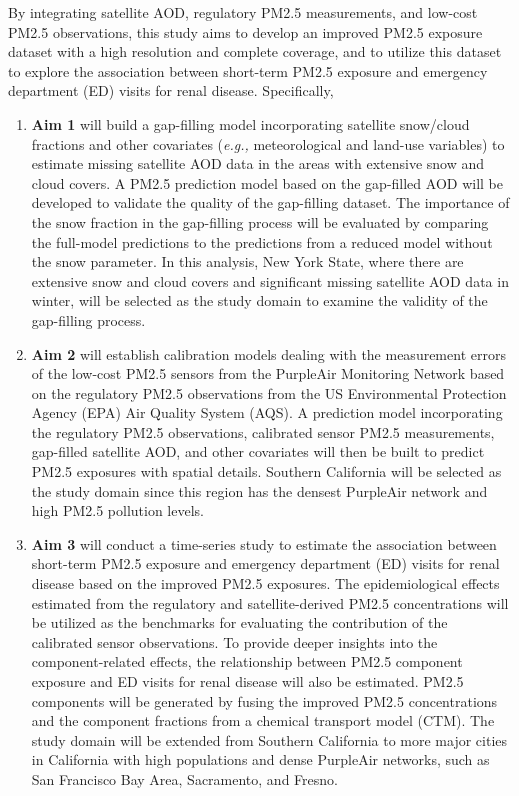 \documentclass[11pt]{article}
\begin{document}
By integrating satellite AOD, regulatory PM2.5 measurements, and low-cost PM2.5 observations, this study aims to develop an improved PM2.5 exposure dataset with a high resolution and complete coverage, and to utilize this dataset to explore the association between short-term PM2.5 exposure and emergency department (ED) visits for renal disease. Specifically,
\begin{enumerate}[1)]
\item \textbf{Aim 1} will build a gap-filling model incorporating satellite snow/cloud fractions and other covariates (\textit{e.g.,} meteorological and land-use variables) to estimate missing satellite AOD data in the areas with extensive snow and cloud covers. A PM2.5 prediction model based on the gap-filled AOD will be developed to validate the quality of the gap-filling dataset. The importance of the snow fraction in the gap-filling process will be evaluated by comparing the full-model predictions to the predictions from a reduced model without the snow parameter. In this analysis, New York State, where there are extensive snow and cloud covers and significant missing satellite AOD data in winter, will be selected as the study domain to examine the validity of the gap-filling process. 
\item \textbf{Aim 2} will establish calibration models dealing with the measurement errors of the low-cost PM2.5 sensors from the PurpleAir Monitoring Network based on the regulatory PM2.5 observations from the US Environmental Protection Agency (EPA) Air Quality System (AQS). A prediction model incorporating the regulatory PM2.5 observations, calibrated sensor PM2.5 measurements, gap-filled satellite AOD, and other covariates will then be built to predict PM2.5 exposures with spatial details. Southern California will be selected as the study domain since this region has the densest PurpleAir network and high PM2.5 pollution levels.
\item \textbf{Aim 3} will conduct a time-series study to estimate the association between short-term PM2.5 exposure and emergency department (ED) visits for renal disease based on the improved PM2.5 exposures. The epidemiological effects estimated from the regulatory and satellite-derived PM2.5 concentrations will be utilized as the benchmarks for evaluating the contribution of the calibrated sensor observations. To provide deeper insights into the component-related effects, the relationship between PM2.5 component exposure and ED visits for renal disease will also be estimated. PM2.5 components will be generated by fusing the improved PM2.5 concentrations and the component fractions from a chemical transport model (CTM). The study domain will be extended from Southern California to more major cities in California with high populations and dense PurpleAir networks, such as San Francisco Bay Area, Sacramento, and Fresno.
\end{enumerate}
\end{document}
